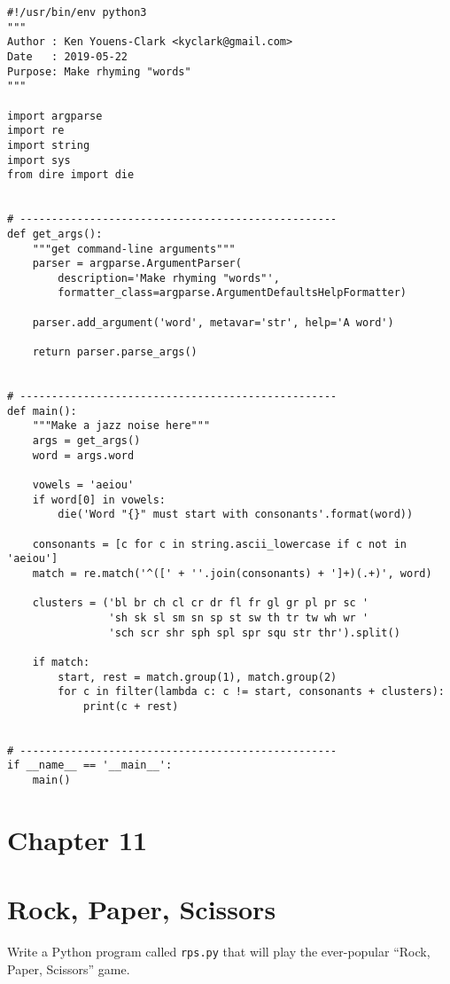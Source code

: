 \documentclass[]{article}
\begin{document}
\begin{verbatim}
#!/usr/bin/env python3
"""
Author : Ken Youens-Clark <kyclark@gmail.com>
Date   : 2019-05-22
Purpose: Make rhyming "words"
"""

import argparse
import re
import string
import sys
from dire import die


# --------------------------------------------------
def get_args():
    """get command-line arguments"""
    parser = argparse.ArgumentParser(
        description='Make rhyming "words"',
        formatter_class=argparse.ArgumentDefaultsHelpFormatter)

    parser.add_argument('word', metavar='str', help='A word')

    return parser.parse_args()


# --------------------------------------------------
def main():
    """Make a jazz noise here"""
    args = get_args()
    word = args.word

    vowels = 'aeiou'
    if word[0] in vowels:
        die('Word "{}" must start with consonants'.format(word))

    consonants = [c for c in string.ascii_lowercase if c not in 'aeiou']
    match = re.match('^([' + ''.join(consonants) + ']+)(.+)', word)

    clusters = ('bl br ch cl cr dr fl fr gl gr pl pr sc '
                'sh sk sl sm sn sp st sw th tr tw wh wr '
                'sch scr shr sph spl spr squ str thr').split()

    if match:
        start, rest = match.group(1), match.group(2)
        for c in filter(lambda c: c != start, consonants + clusters):
            print(c + rest)


# --------------------------------------------------
if __name__ == '__main__':
    main()
\end{verbatim}

\pagebreak

\hypertarget{chapter-11}{%
\section{Chapter 11}\label{chapter-11}}

\hypertarget{rock-paper-scissors}{%
\section{Rock, Paper, Scissors}\label{rock-paper-scissors}}

Write a Python program called \texttt{rps.py} that will play the
ever-popular ``Rock, Paper, Scissors'' game.
\end{document}
